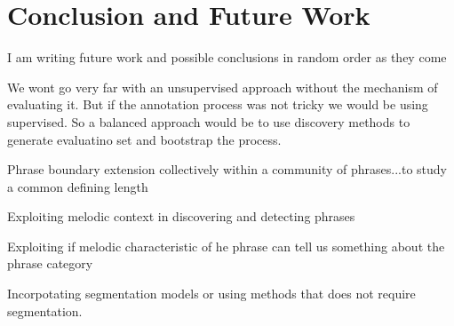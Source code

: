 \section{Conclusion and Future Work }

I am writing future work and possible conclusions in random order as they come 

We wont go very far with an unsupervised approach without the mechanism of evaluating it. But if the annotation process was not tricky we would be using supervised. So a balanced approach would be to use discovery methods to generate evaluatino set and bootstrap the process. 

Phrase boundary extension collectively within a community of phrases...to study a common defining length

Exploiting melodic context in discovering and detecting phrases

Exploiting if melodic characteristic of he phrase can tell us something about the phrase category

Incorpotating segmentation models or using methods that does not require segmentation.




